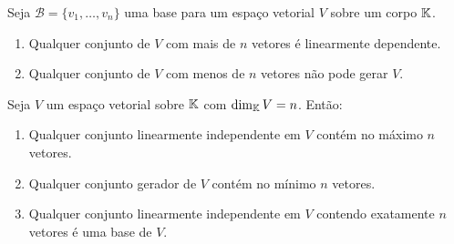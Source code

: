 \documentclass{beamer}
\begin{document}
\begin{frame}
  \begin{teorema}
    Seja $\mathcal{B} = \{v_1, \dots, v_n\}$ uma base \pause para um espaço vetorial $V$ sobre um corpo $\mathbb{K}$. \pause
    \begin{enumerate}[label={\roman*})]
      \vspace{.2cm}

      \item Qualquer conjunto  de $V$ com mais de $n$ vetores \pause é linearmente dependente. \pause

      \vspace{1cm}

      \item Qualquer conjunto de $V$ com menos de $n$ vetores \pause não pode gerar $V$.
    \end{enumerate}
  \end{teorema}
\end{frame}


\begin{frame}
  \begin{teorema}
    Seja $V$ um espaço vetorial sobre $\mathbb{K}$ \pause com $\dim_{\mathbb{K}} V = n$. \pause Então: \pause
    \begin{enumerate}[label={\roman*})]
      \vspace{.2cm}

      \item Qualquer conjunto linearmente independente em $V$ \pause contém no máximo $n$ vetores. \pause

      \vspace{1cm}

      \item Qualquer conjunto gerador de $V$ \pause contém no mínimo $n$ vetores. \pause

      \vspace{1cm}

      \item Qualquer conjunto linearmente independente em $V$ \pause contendo exatamente $n$ vetores \pause é uma base de $V$.

      \seti

     \end{enumerate}
  \end{teorema}
\end{frame}
\end{document}
